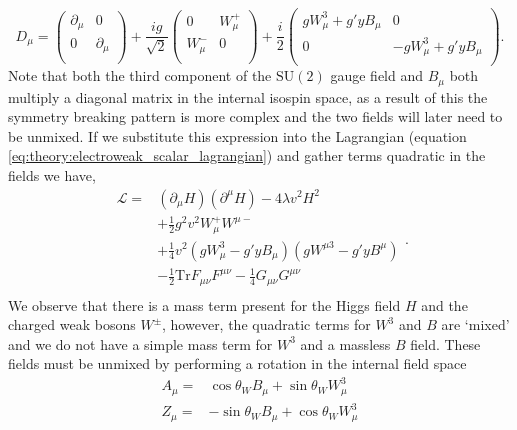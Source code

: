 \begin{equation}
    \label{eq:theory:explicit_covderiv_ew}
    D_{\mu} = 
    \begin{pmatrix}
        \partial_{\mu} & 0 \\
        0 & \partial_{\mu} \\
    \end{pmatrix} + 
    \frac{ig}{\sqrt{2}}
    \begin{pmatrix}
        0 & W_{\mu}^{+} \\
        W_{\mu}^{-} & 0  \\
    \end{pmatrix} +
    \frac{i}{2}
    \begin{pmatrix}
        gW_{\mu}^{3} + g'yB_{\mu} & 0 \\
        0 & -gW_{\mu}^{3} + g'yB_{\mu} \\
    \end{pmatrix}.
\end{equation}
Note that both the third component of the $\mathrm{SU}(2)$ gauge field and $B_{\mu}$ both multiply a diagonal matrix in the internal isospin space, as a result of this the symmetry breaking pattern is more complex and the two fields will later need to be unmixed. 
If we substitute this expression into the Lagrangian (equation \ref{eq:theory:electroweak_scalar_lagrangian}) and gather terms quadratic in the fields we have,
\begin{equation}
    \label{eq:theory:electroweak_scalar_quad}
    \begin{split}
    \mathcal{L} =& (\partial_{\mu}H)(\partial^{\mu}H) - 4\lambda{v}^{2}H^{2} \\
                 &+ \frac{1}{2}g^{2}v^{2}W_{\mu}^{+}W^{\mu -} \\
                 &+ \frac{1}{4}v^{2}(gW_{\mu}^{3} - g'yB_{\mu})(gW^{\mu 3} - g'yB^{\mu}) \\
                 &- \frac{1}{2}\mathrm{Tr}F_{\mu\nu}F^{\mu\nu} - \frac{1}{4}G_{\mu\nu}G^{\mu\nu} \\
    \end{split}.
\end{equation}
We observe that there is a mass term present for the Higgs field $H$ and the charged weak bosons $W^{\pm}$, however, the quadratic terms for $W^{3}$ and $B$ are `mixed' and we do not have a simple mass term for $W^{3}$ and a massless $B$ field. These fields must be unmixed by performing a rotation in the internal field space 
\begin{equation}
    \begin{split}
    A_{\mu} =& \cos{\theta_{W}}B_{\mu} + \sin{\theta_{W}}W_{\mu}^{3} \\
    Z_{\mu} =& -\sin{\theta_{W}}B_{\mu} + \cos{\theta_{W}}W_{\mu}^{3} \\
    \end{split}
    \label{eq:theory:mass_diag_fields}
\end{equation}
